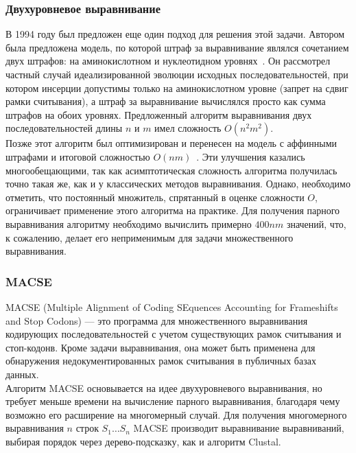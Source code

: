 \subsubsection[Двухуровневое выравнивание]{\large Двухуровневое выравнивание} \label{NTAAalign}
\hspace{\parindent} В 1994 году был предложен еще один подход для решения этой задачи. Автором была предложена модель, по которой штраф за выравнивание являлся сочетанием двух штрафов: на аминокислотном и нуклеотидном уровнях~\cite{Hein}. Он рассмотрел частный случай идеализированной эволюции исходных последовательностей, при котором инсерции допустимы только на аминокислотном уровне (запрет на сдвиг рамки считывания), а штраф за выравнивание вычислялся просто как сумма штрафов на обоих уровнях. Предложенный алгоритм выравнивания двух последовательностей длины $n$ и $m$ имел сложность $O(n^2m^2)$.\\
\indent Позже этот алгоритм был оптимизирован и перенесен на модель с аффинными штрафами и итоговой сложностью $O(nm)$~\cite{HeinOptimize}. Эти улучшения казались многообещающими, так как асимптотическая сложность алгоритма получилась точно такая же, как и у классических методов выравнивания. Однако, необходимо отметить, что постоянный множитель, спрятанный в оценке сложности $O$, ограничивает применение этого алгоритма на практике. Для получения парного выравнивания алгоритму необходимо вычислить примерно $400nm$ значений, что, к сожалению, делает его неприменимым для задачи множественного выравнивания.

\subsubsection[MACSE]{\large MACSE}
\hspace{\parindent} MACSE (Multiple Alignment of Coding SEquences Accounting for Frameshifts and Stop Codons) --- это программа для множественного выравнивания кодирующих последовательностей с учетом существующих рамок считывания и стоп-кодонв. Кроме задачи выравнивания, она может быть применена для обнаружения недокументированных рамок считывания в публичных базах данных.\\
\indent Алгоритм MACSE основывается на идее двухуровневого выравнивания, но требует меньше времени на вычисление парного выравнивания, благодаря чему возможно его расширение на многомерный случай. Для получения многомерного выравнивания $n$ строк $S_1 \ldots S_n$ MACSE производит выравнивание выравниваний, выбирая порядок через дерево-подсказку, как и алгоритм Clustal. 